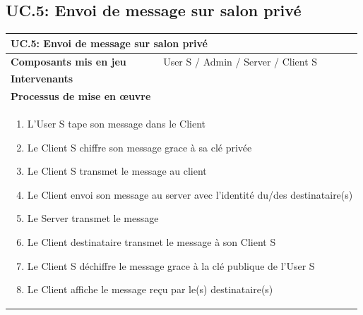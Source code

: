 \documentclass[a4paper,11pt,french]{article}
\begin{document}
\subsection{UC.5: Envoi de message sur salon privé}
\begin{center}
	\vspace*{0.7cm}
	\begin{tabularx}{16cm}{|l|X|}
	\hline
	\multicolumn{2}{|l|}{\textbf{UC.5: Envoi de message sur salon privé}}\\
	\hline
	\textbf{Composants mis en jeu} & User S / Admin / Server / Client S \\
	\hline
	\textbf{Intervenants} & \\
	\hline
	\multicolumn{2}{|l|}{\textbf{Processus de mise en \oe uvre}}\\
	\hline
	\multicolumn{2}{|p{15cm}|}{\begin{enumerate}\item L'User S tape son message dans le Client \item Le Client S chiffre son message grace à sa clé privée \item Le Client S transmet le message au client \item Le Client envoi son message au server avec l'identité du/des destinataire(s) \item Le Server transmet le message \item Le Client destinataire transmet le message à son Client S \item Le Client S déchiffre le message grace à la clé publique de l'User S \item Le Client affiche le message re\c cu par le(s) destinataire(s) \end{enumerate}}\\
	\hline
	\end{tabularx}
\end{center}
\end{document}
